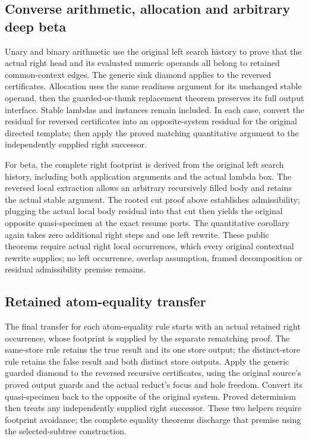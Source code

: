 \subsection{Converse arithmetic, allocation and arbitrary deep beta}
Unary and binary arithmetic use the original left search history to prove
that the actual right head and its evaluated numeric operands all belong
to retained common-context edges. The generic sink diamond applies to the
reversed certificates. Allocation uses the same readiness argument for its
unchanged stable operand, then the guarded-or-thunk replacement theorem
preserves its full output interface. Stable lambdas and instances remain
included. In each case, convert the residual for reversed certificates
into an opposite-system residual for the original directed template;
then apply the proved matching quantitative argument to the independently
supplied right successor.

For beta, the complete right footprint is derived from the original left
search history, including both application arguments and the actual
lambda box. The reversed local extraction allows an arbitrary recursively
filled body and retains the actual stable argument. The rooted cut proof
above establishes admissibility; plugging the actual local body residual
into that cut then yields the original opposite quasi-specimen at the
exact resume ports. The quantitative corollary again takes zero additional
right steps and one left rewrite. These public theorems require actual
right local occurrences, which every original contextual rewrite supplies;
no left occurrence, overlap assumption, framed decomposition or residual
admissibility premise remains.

\subsection{Retained atom-equality transfer}
The final transfer for each atom-equality rule starts with an actual retained
right occurrence, whose footprint is supplied by the separate rematching
proof. The same-store rule retains the true result and its one store output;
the distinct-store rule retains the false result and both distinct store
outputs. Apply the generic guarded diamond to the reversed recursive
certificates, using the original source's proved output guards and the
actual reduct's focus and hole freedom. Convert its quasi-specimen back to
the opposite of the original system. Proved determinism then treats any
independently supplied right successor. These two helpers require footprint
avoidance; the complete equality theorems discharge that premise using the
selected-subtree construction.

